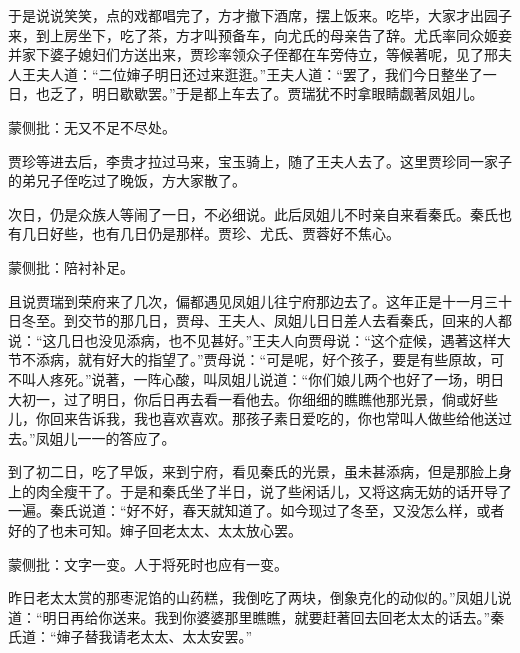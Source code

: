 \begin{parag}


    于是说说笑笑，点的戏都唱完了，方才撤下酒席，摆上饭来。吃毕，大家才出园子来，到上房坐下，吃了茶，方才叫预备车，向尤氏的母亲告了辞。尤氏率同众姬妾并家下婆子媳妇们方送出来，贾珍率领众子侄都在车旁侍立，等候著呢，见了邢夫人王夫人道：“二位婶子明日还过来逛逛。”王夫人道：“罢了，我们今日整坐了一日，也乏了，明日歇歇罢。”于是都上车去了。贾瑞犹不时拿眼睛觑著凤姐儿。\begin{note}蒙侧批：无又不足不尽处。\end{note}贾珍等进去后，李贵才拉过马来，宝玉骑上，随了王夫人去了。这里贾珍同一家子的弟兄子侄吃过了晚饭，方大家散了。
\end{parag}


\begin{parag}


    次日，仍是众族人等闹了一日，不必细说。此后凤姐儿不时亲自来看秦氏。秦氏也有几日好些，也有几日仍是那样。贾珍、尤氏、贾蓉好不焦心。\begin{note}蒙侧批：陪衬补足。\end{note}
\end{parag}


\begin{parag}


    且说贾瑞到荣府来了几次，偏都遇见凤姐儿往宁府那边去了。这年正是十一月三十日冬至。到交节的那几日，贾母、王夫人、凤姐儿日日差人去看秦氏，回来的人都说：“这几日也没见添病，也不见甚好。”王夫人向贾母说：“这个症候，遇著这样大节不添病，就有好大的指望了。”贾母说：“可是呢，好个孩子，要是有些原故，可不叫人疼死。”说著，一阵心酸，叫凤姐儿说道：“你们娘儿两个也好了一场，明日大初一，过了明日，你后日再去看一看他去。你细细的瞧瞧他那光景，倘或好些儿，你回来告诉我，我也喜欢喜欢。那孩子素日爱吃的，你也常叫人做些给他送过去。”凤姐儿一一的答应了。
\end{parag}


\begin{parag}


    到了初二日，吃了早饭，来到宁府，看见秦氏的光景，虽未甚添病，但是那脸上身上的肉全瘦干了。于是和秦氏坐了半日，说了些闲话儿，又将这病无妨的话开导了一遍。秦氏说道：“好不好，春天就知道了。如今现过了冬至，又没怎么样，或者好的了也未可知。婶子回老太太、太太放心罢。\begin{note}蒙侧批：文字一变。人于将死时也应有一变。\end{note}昨日老太太赏的那枣泥馅的山药糕，我倒吃了两块，倒象克化的动似的。”凤姐儿说道：“明日再给你送来。我到你婆婆那里瞧瞧，就要赶著回去回老太太的话去。”秦氏道：“婶子替我请老太太、太太安罢。”
\end{parag}


